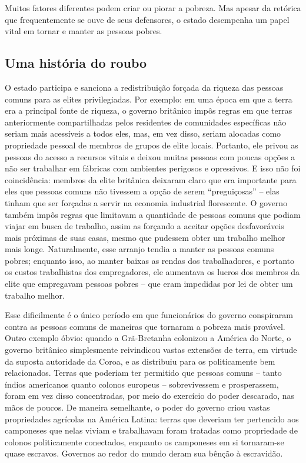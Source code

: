 Muitos fatores diferentes podem criar ou piorar a pobreza. Mas apesar da retórica que frequentemente se ouve de seus defensores, o estado desempenha um papel vital em tornar e manter as pessoas pobres.

\subsection*{Uma história do roubo}

O estado participa e sanciona a redistribuição forçada da riqueza das pessoas comuns para as elites privilegiadas. Por exemplo: em uma época em que a terra era a principal fonte de riqueza, o governo britânico impôs regras em que terras anteriormente compartilhadas pelos residentes de comunidades específicas não seriam mais acessíveis a todos eles, mas, em vez disso, seriam alocadas como propriedade pessoal de membros de grupos de elite locais. Portanto, ele privou as pessoas do acesso a recursos vitais e deixou muitas pessoas com poucas opções a não ser trabalhar em fábricas com ambientes perigosos e opressivos. E isso não foi coincidência: membros da elite britânica deixaram claro que era importante para eles que pessoas comuns não tivessem a opção de serem ``preguiçosas'' -- elas tinham que ser forçadas a servir na economia industrial florescente. O governo também impôs regras que limitavam a quantidade de pessoas comuns que podiam viajar em busca de trabalho, assim as forçando a aceitar opções desfavoráveis mais próximas de suas casas, mesmo que pudessem obter um trabalho melhor mais longe. Naturalmente, esse arranjo tendia a manter as pessoas comuns pobres; enquanto isso, ao manter baixas as rendas dos trabalhadores, e portanto os custos trabalhistas dos empregadores, ele aumentava os lucros dos membros da elite que empregavam pessoas pobres -- que eram impedidas por lei de obter um trabalho melhor.

Esse dificilmente é o único período em que funcionários do governo conspiraram contra as pessoas comuns de maneiras que tornaram a pobreza mais provável. Outro exemplo óbvio: quando a Grã-Bretanha colonizou a América do Norte, o governo britânico simplesmente reivindicou vastas extensões de terra, em virtude da suposta autoridade da Coroa, e as distribuiu para os politicamente bem relacionados. Terras que poderiam ter permitido que pessoas comuns -- tanto índios americanos quanto colonos europeus -- sobrevivessem e prosperassem, foram em vez disso concentradas, por meio do exercício do poder descarado, nas mãos de poucos. De maneira semelhante, o poder do governo criou vastas propriedades agrícolas na América Latina: terras que deveriam ter pertencido aos camponeses que nelas viviam e trabalhavam foram tratadas como propriedade de colonos politicamente conectados, enquanto os camponeses em si tornaram-se quase escravos. Governos ao redor do mundo deram sua bênção à escravidão.

